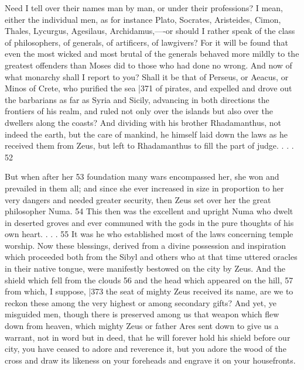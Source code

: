 Need I tell over their names man by man, or under their professions? I mean, either the individual men, as for instance Plato, Socrates,
Aristeides, Cimon, Thales, Lycurgus, Agesilaus, Archidamus,----or should I rather speak of the class of philosophers, of generals, of artificers, of lawgivers? For it will be found that even the most wicked and most brutal of the generals behaved more mildly to the greatest offenders than Moses did to those who had done no wrong. And now of what monarchy shall I report to you? Shall it be that of Perseus, or Aeacus, or Minos of Crete, who purified the sea
|371 of pirates, and expelled and drove out the barbarians as far as Syria and Sicily, advancing in both directions the frontiers of his realm, and ruled not only over the islands but also over the dwellers along the coasts? And dividing with his brother Rhadamanthus, not indeed the earth, but the care of mankind, he himself laid down the laws as he received them from Zeus, but left to Rhadamanthus to fill the part of judge. . . . 52

But when after her 53 foundation many wars encompassed her, she won and prevailed in them all; and since she ever increased in size in proportion to her very dangers and needed greater security, then Zeus set over her the great philosopher Numa. 54 This then was the excellent and upright Numa who dwelt in deserted groves and ever communed with the gods in the pure thoughts of his own heart. . . . 55 It was he who established most of the laws concerning temple worship. Now these blessings, derived from a divine possession and inspiration which proceeded both from the Sibyl and others who at that time uttered oracles in their native tongue, were manifestly bestowed on the city by Zeus. And the shield which fell from the clouds
56 and the head which appeared on the hill, 57 from which,
I suppose, |373 the seat of mighty Zeus received its name, are we to reckon these among the very highest or among secondary gifts? And yet, ye misguided men, though there is preserved among us that weapon which flew down from heaven, which mighty Zeus or father Ares sent down to give us a warrant, not in word but in deed, that he will forever hold his shield before our city, you have ceased to adore and reverence it, but you adore the wood of the cross and draw its likeness on your foreheads and engrave it on your housefronts.

